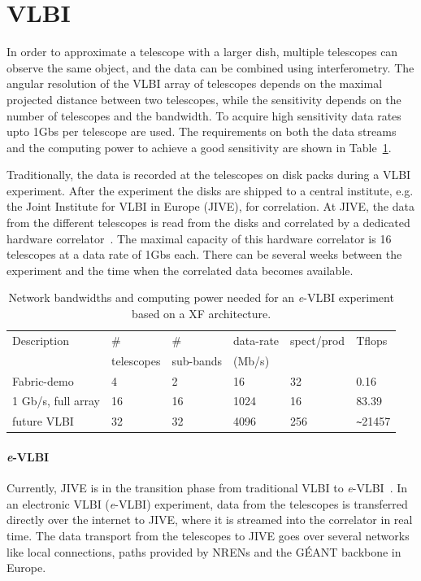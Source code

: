 \section{VLBI}\label{sec:vlbi}
In order to approximate a telescope with a larger dish, multiple
telescopes can observe the same object, and the data can be combined
using interferometry. The angular resolution of the VLBI array of
telescopes depends on the maximal projected distance between two
telescopes, while the sensitivity depends on the number of telescopes
and the bandwidth. To acquire high sensitivity data rates upto 1Gbs
per telescope are used.  The requirements on both the data streams and
the computing power to achieve a good sensitivity are shown in
Table~\ref{tab:speed}.

Traditionally, the data is recorded at the telescopes on
disk packs during a VLBI experiment. After the experiment the disks
are shipped to a central institute, e.g. the Joint Institute for VLBI
in Europe (JIVE), for correlation. At JIVE, the data from the
different telescopes is read from the disks and correlated by a
dedicated hardware correlator~\cite{EVNCorrelator}. The maximal
capacity of this hardware correlator is 16 telescopes at a data rate
of 1Gbs each.  There can be several weeks between the experiment and
the time when the correlated data becomes available.

\begin{table}
  \centering
  \begin{tabular}[c]{|l|l|l|l|l|l|}
    \hline
    Description & \# & \#  & data-rate & spect/prod & Tflops\\
    & telescopes & sub-bands & (Mb/s) &  & \\
    \hline
    \hline
    Fabric-demo &4 &2 &16 &32 &0.16\\
    1 Gb/s, full array  &16 &16 &1024 &16 &83.39\\
    future VLBI &32 &32 &4096 &256 &\verb|~|21457\\
    \hline
  \end{tabular}
  \caption{Network bandwidths and computing power needed for an {\it e}-VLBI
    experiment based on a XF architecture.}
  \label{tab:speed}
\end{table}
\paragraph{{\it e}-VLBI}
Currently, JIVE is in the transition phase from traditional VLBI to
{\it e}-VLBI~\cite{szomoru-2004}. In an electronic VLBI ({\it e}-VLBI)
experiment, data from the telescopes is transferred directly over the
internet to JIVE, where it is streamed into the correlator in real
time. The data transport from the telescopes to JIVE goes over several
networks like local connections, paths provided by NRENs and the
G\'EANT backbone in Europe.

